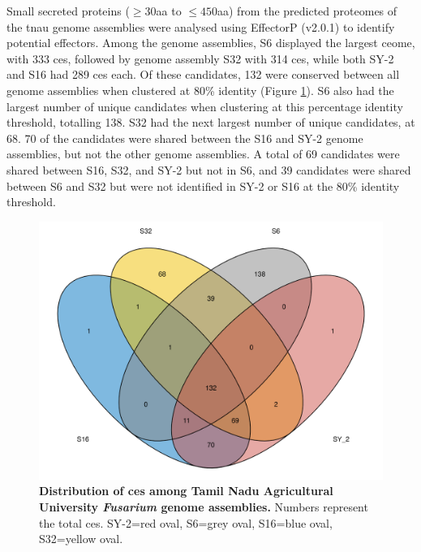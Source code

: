 Small secreted proteins ($\geq30$aa to $\leq450$aa)  from the predicted proteomes of the \ac{tnau} genome assemblies were analysed using EffectorP (v2.0.1) to identify potential effectors. Among the genome assemblies, S6 displayed the largest \acl{ce}ome, with 333 \acp{ce}, followed by genome assembly S32 with 314 \acp{ce}, while both SY-2 and S16 had 289 \acp{ce} each. Of these candidates, 132 were conserved between all genome assemblies when clustered at 80\% identity (Figure \ref{fig:TNAUVenn}). S6 also had the largest number of unique candidates when clustering at this percentage identity threshold, totalling 138. S32 had the next largest number of unique candidates, at 68. 70 of the candidates were shared between the S16 and SY-2 genome assemblies, but not the other genome assemblies. A total of 69 candidates were shared between S16, S32, and SY-2 but not in S6, and 39 candidates were shared between S6 and S32 but were not identified in SY-2 or S16 at the  80\% identity threshold. 

\begin{figure}[h!]
  \centering
  \includegraphics[width=\textwidth]{Figures/sharedCandEffsVenn.png}
  \caption[Distribution of \acp{ce} among Tamil Nadu Agricultural University \textit{Fusarium} genome assemblies.]{\textbf{Distribution of \acp{ce} among Tamil Nadu Agricultural University \textit{Fusarium} genome assemblies.} Numbers represent the total \acp{ce}. SY-2=red oval, S6=grey oval, S16=blue oval, S32=yellow oval.}
  \label{fig:TNAUVenn}
\end{figure}


\clearpage
